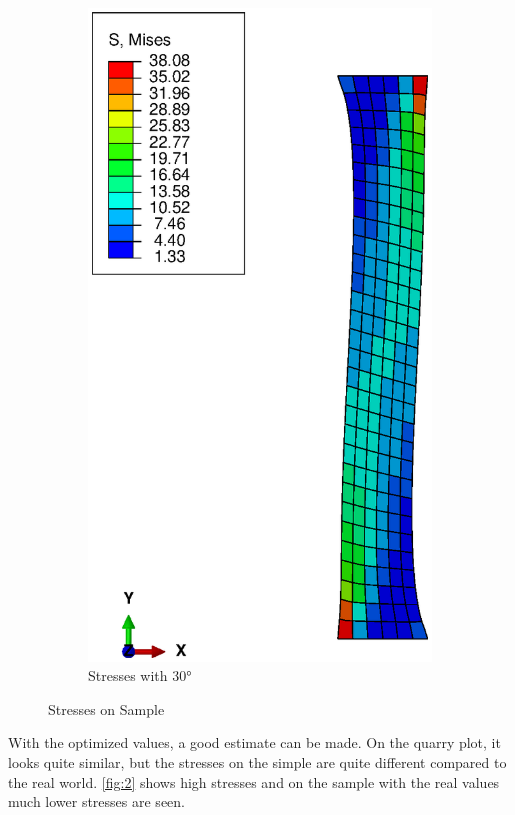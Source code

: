 \documentclass[12pt]{article}
\begin{document}
\begin{figure}[!htb]
\begin{subfigure}{.5\textwidth}
    \includegraphics[width=0.95\linewidth]{pics/s_mises_30}
    \caption{Stresses with \ang{30}}
   \end{subfigure}
  \caption{Stresses on Sample}
  \label{fig:4}
\end{figure}
With the optimized values, a good estimate can be made. On the quarry plot, it looks quite similar, but the stresses on the simple are quite different compared to the real world. \ref{fig:2} shows high stresses and on the sample with the real values much lower stresses are seen.
\end{document}
